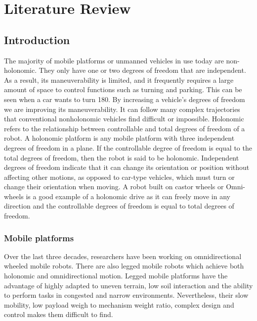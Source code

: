 \section{Literature Review}

\label{sec:review}

\subsection{Introduction}

The majority of mobile platforms or unmanned vehicles in use today are non-holonomic.
They only have one or two degrees of freedom that are independent.
As a result, its maneuverability is limited, and it frequently requires a large amount of space to control functions such as turning and parking.
This can be seen when a car wants to turn 180\degree.
By increasing a vehicle's degrees of freedom we are improving its maneuverability.
It can follow many complex trajectories that conventional nonholonomic vehicles find difficult or impossible.
Holonomic refers to the relationship between controllable and total degrees of freedom of a robot.
A holonomic platform is any mobile platform with three independent degrees of freedom in a plane.
If the controllable degree of freedom is equal to the total degrees of freedom, then the robot is said to be holonomic.
Independent degrees of freedom indicate that it can change its orientation or position without affecting other motions, as opposed to car-type vehicles, which must turn or change their orientation when moving.
A robot built on castor wheels or Omni-wheels is a good example of a holonomic drive as it can freely move in any direction and the controllable degrees of freedom is equal to total degrees of freedom. 


\subsubsection{Mobile platforms}

Over the last three decades, researchers have been working on omnidirectional wheeled mobile robots.
There are also legged mobile robots which achieve both holonomic and omnidirectional motion.
Legged mobile platforms have the advantage of highly adapted to uneven terrain, low soil interaction and the ability to perform tasks in congested and narrow environments.
Nevertheless, their slow mobility, low payload weigh to mechanism weight ratio, complex design and control makes them difficult to find\cite{seeni_2008}.

